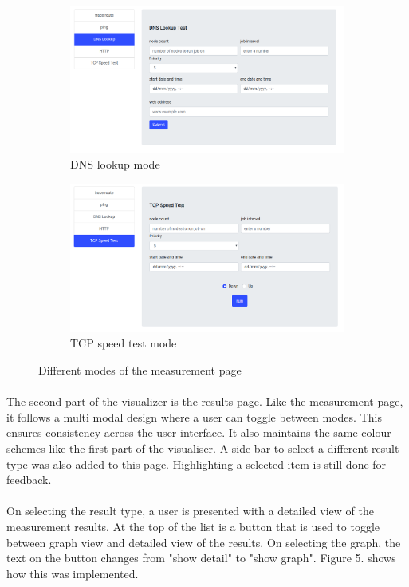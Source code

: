 \begin{figure}
\begin{subfigure}{.5\textwidth}
	\centering
	\includegraphics[width=.8\linewidth]{images/dlookup}
	\caption{DNS lookup mode}
	\label{fig:sfig4}
\end{subfigure}
\begin{subfigure}{.5\textwidth}
	\centering
	\includegraphics[width=.8\linewidth]{images/tcp}
	\caption{TCP speed test mode}
	\label{fig:sfig5}
\end{subfigure}
	\caption{Different modes of the measurement page}
	\label{fig:fig}
\end{figure}

\paragraph{}
The second part of the visualizer is the results page. Like the measurement page, it follows a multi modal design where a user can toggle between modes. This ensures consistency across the user interface\cite{goldenrules}. It also maintains the same colour schemes like the first part of the visualiser. A side bar to select a different result type was also added to this page. Highlighting a selected item is still done for feedback.
\paragraph{}
On selecting the result type, a user is presented with a detailed view of the measurement results. At the top of the list is a button that is used to toggle between graph view and detailed view of the results. On selecting the graph, the text on the button changes from "show detail" to "show graph". Figure 5. shows how this was implemented. 
